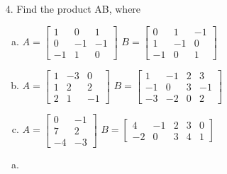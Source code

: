 \begin{itemize}
\begin{enumerate}[a.]
         \end{enumerate}
   \item[4.] Find the product AB, where
         \begin{enumerate}[a.]
            \item
                  $A = \begin{bmatrix}
                        1  & 0  & 1  \\
                        0  & -1 & -1 \\
                        -1 & 1  & 0
                     \end{bmatrix}$
                  $B = \begin{bmatrix}
                        0  & 1  & -1 \\
                        1  & -1 & 0  \\
                        -1 & 0  & 1
                     \end{bmatrix}$
            \item
                  $A = \begin{bmatrix}
                        1 & -3 & 0  \\
                        1 & 2  & 2  \\
                        2 & 1  & -1
                     \end{bmatrix}$
                  $B = \begin{bmatrix}
                        1  & -1 & 2 & 3  \\
                        -1 & 0  & 3 & -1 \\
                        -3 & -2 & 0 & 2
                     \end{bmatrix}$
            \item
                  $A = \begin{bmatrix}
                        0  & -1 \\
                        7  & 2  \\
                        -4 & -3
                     \end{bmatrix}$
                  $B = \begin{bmatrix}
                        4  & -1 & 2 & 3 & 0 \\
                        -2 & 0  & 3 & 4 & 1
                     \end{bmatrix}$
         \end{enumerate}
         \answer
         \begin{enumerate}[a.]
            \item

\end{enumerate}
\end{itemize}
